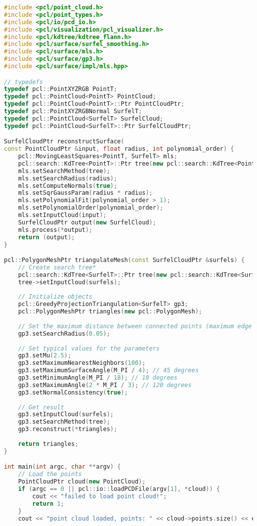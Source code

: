 \begin{lstlisting}[language=c++,caption=slambook2/ch12/dense_RGBD/surfel_mapping.cpp]
#include <pcl/point_cloud.h>
#include <pcl/point_types.h>
#include <pcl/io/pcd_io.h>
#include <pcl/visualization/pcl_visualizer.h>
#include <pcl/kdtree/kdtree_flann.h>
#include <pcl/surface/surfel_smoothing.h>
#include <pcl/surface/mls.h>
#include <pcl/surface/gp3.h>
#include <pcl/surface/impl/mls.hpp>

// typedefs
typedef pcl::PointXYZRGB PointT;
typedef pcl::PointCloud<PointT> PointCloud;
typedef pcl::PointCloud<PointT>::Ptr PointCloudPtr;
typedef pcl::PointXYZRGBNormal SurfelT;
typedef pcl::PointCloud<SurfelT> SurfelCloud;
typedef pcl::PointCloud<SurfelT>::Ptr SurfelCloudPtr;

SurfelCloudPtr reconstructSurface(
const PointCloudPtr &input, float radius, int polynomial_order) {
	pcl::MovingLeastSquares<PointT, SurfelT> mls;
	pcl::search::KdTree<PointT>::Ptr tree(new pcl::search::KdTree<PointT>);
	mls.setSearchMethod(tree);
	mls.setSearchRadius(radius);
	mls.setComputeNormals(true);
	mls.setSqrGaussParam(radius * radius);
	mls.setPolynomialFit(polynomial_order > 1);
	mls.setPolynomialOrder(polynomial_order);
	mls.setInputCloud(input);
	SurfelCloudPtr output(new SurfelCloud);
	mls.process(*output);
	return (output);
}

pcl::PolygonMeshPtr triangulateMesh(const SurfelCloudPtr &surfels) {
	// Create search tree*
	pcl::search::KdTree<SurfelT>::Ptr tree(new pcl::search::KdTree<SurfelT>);
	tree->setInputCloud(surfels);
	
	// Initialize objects
	pcl::GreedyProjectionTriangulation<SurfelT> gp3;
	pcl::PolygonMeshPtr triangles(new pcl::PolygonMesh);
	
	// Set the maximum distance between connected points (maximum edge length)
	gp3.setSearchRadius(0.05);
	
	// Set typical values for the parameters
	gp3.setMu(2.5);
	gp3.setMaximumNearestNeighbors(100);
	gp3.setMaximumSurfaceAngle(M_PI / 4); // 45 degrees
	gp3.setMinimumAngle(M_PI / 18); // 10 degrees
	gp3.setMaximumAngle(2 * M_PI / 3); // 120 degrees
	gp3.setNormalConsistency(true);
	
	// Get result
	gp3.setInputCloud(surfels);
	gp3.setSearchMethod(tree);
	gp3.reconstruct(*triangles);
	
	return triangles;
}

int main(int argc, char **argv) {
	// Load the points
	PointCloudPtr cloud(new PointCloud);
	if (argc == 0 || pcl::io::loadPCDFile(argv[1], *cloud)) {
		cout << "failed to load point cloud!";
		return 1;
	}
	cout << "point cloud loaded, points: " << cloud->points.size() << endl;
	

\end{lstlisting}
